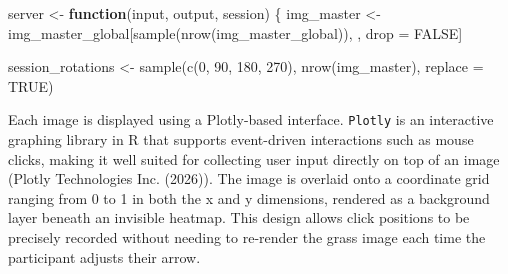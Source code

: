 \documentclass[
]{article}
\newenvironment{Shaded}{\begin{snugshade}}{\end{snugshade}}
\newcommand{\AttributeTok}[1]{\textcolor[rgb]{0.40,0.45,0.13}{#1}}
\newcommand{\ConstantTok}[1]{\textcolor[rgb]{0.56,0.35,0.01}{#1}}
\newcommand{\ControlFlowTok}[1]{\textcolor[rgb]{0.00,0.23,0.31}{\textbf{#1}}}
\newcommand{\DecValTok}[1]{\textcolor[rgb]{0.68,0.00,0.00}{#1}}
\newcommand{\FunctionTok}[1]{\textcolor[rgb]{0.28,0.35,0.67}{#1}}
\newcommand{\NormalTok}[1]{\textcolor[rgb]{0.00,0.23,0.31}{#1}}
\newcommand{\OtherTok}[1]{\textcolor[rgb]{0.00,0.23,0.31}{#1}}
\begin{document}
\begin{Shaded}
\begin{Highlighting}[]
\NormalTok{server }\OtherTok{\textless{}{-}} \ControlFlowTok{function}\NormalTok{(input, output, session) \{}
\NormalTok{  img\_master }\OtherTok{\textless{}{-}}\NormalTok{ img\_master\_global[}\FunctionTok{sample}\NormalTok{(}\FunctionTok{nrow}\NormalTok{(img\_master\_global)), }
\NormalTok{  , drop }\OtherTok{=} \ConstantTok{FALSE}\NormalTok{]}
  
\NormalTok{  session\_rotations }\OtherTok{\textless{}{-}} \FunctionTok{sample}\NormalTok{(}\FunctionTok{c}\NormalTok{(}\DecValTok{0}\NormalTok{, }\DecValTok{90}\NormalTok{, }\DecValTok{180}\NormalTok{, }\DecValTok{270}\NormalTok{), }
  \FunctionTok{nrow}\NormalTok{(img\_master), }\AttributeTok{replace =} \ConstantTok{TRUE}\NormalTok{)}
\end{Highlighting}
\end{Shaded}

Each image is displayed using a Plotly-based interface. \texttt{Plotly}
is an interactive graphing library in R that supports event-driven
interactions such as mouse clicks, making it well suited for collecting
user input directly on top of an image (Plotly Technologies Inc.
(2026)). The image is overlaid onto a coordinate grid ranging from 0 to
1 in both the x and y dimensions, rendered as a background layer beneath
an invisible heatmap. This design allows click positions to be precisely
recorded without needing to re-render the grass image each time the
participant adjusts their arrow.
\end{document}
